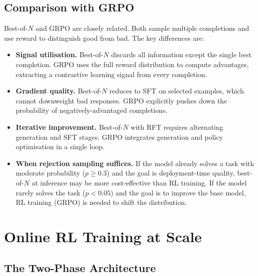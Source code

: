 \subsection{Comparison with GRPO}

Best-of-$N$ and GRPO are closely related.  Both sample multiple completions and use reward to distinguish good from bad.  The key differences are:
\begin{itemize}[leftmargin=*]
  \item \textbf{Signal utilisation.}  Best-of-$N$ discards all information except the single best completion.  GRPO uses the full reward distribution to compute advantages, extracting a contrastive learning signal from every completion.
  \item \textbf{Gradient quality.}  Best-of-$N$ reduces to SFT on selected examples, which cannot downweight bad responses.  GRPO explicitly pushes down the probability of negatively-advantaged completions.
  \item \textbf{Iterative improvement.}  Best-of-$N$ with RFT requires alternating generation and SFT stages.  GRPO integrates generation and policy optimisation in a single loop.
  \item \textbf{When rejection sampling suffices.}  If the model already solves a task with moderate probability ($p \geq 0.3$) and the goal is deployment-time quality, best-of-$N$ at inference may be more cost-effective than RL training.  If the model rarely solves the task ($p < 0.05$) and the goal is to improve the base model, RL training (GRPO) is needed to shift the distribution.
\end{itemize}

\section{Online RL Training at Scale}
\label{sec:grpo-scale}


\subsection{The Two-Phase Architecture}

